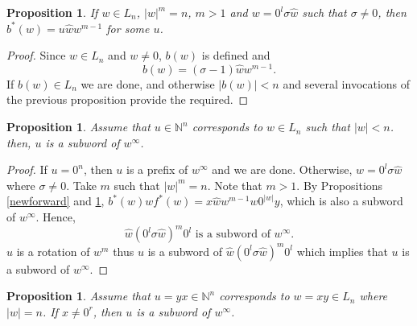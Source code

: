 \documentclass{article}
\newtheorem{proposition}[theorem]{Proposition}
\theoremstyle{definition}
\begin{document}


\begin{proposition}
\label{*-back}
If $w\in L_n$, $|w|^m=n$, $m>1$ and $w= 0^l\sigma\hat{w}$ such that $\sigma\neq 0$, then $b^*(w)=u\hat{w}w^{m-1}$ for some $u$.
\end{proposition}

\begin{proof}
Since $w\in L_n$ and $w\neq 0$, $b(w)$ is defined and 
$$b(w)=(\sigma-1)\hat{w}w^{m-1}.$$
If $b(w)\in L_n$ we are done, and otherwise $|b(w)|<n$ and several invocations of the previous proposition provide the required.
\end{proof}


\begin{proposition}
Assume that $u\in \mathbb{N}^n$ corresponds to $w\in L_n$ such that $|w|<n$. then, $u$ is a subword of $w^\infty$. 
\end{proposition}

\begin{proof}
If $u=0^n$, then $u$ is a prefix of $w^\infty$ and we are done. Otherwise, $w=0^l\sigma\hat{w}$ where $\sigma\neq 0$. Take $m$ such that $|w|^m=n$. Note that $m>1$. By Propositions \ref{newforward} and  \ref{*-back}, $b^*(w)wf^*(w)=x\hat{w}w^{m-1}w0^{|w|}y$, which is also a subword of $w^\infty$. Hence, 
$$\hat{w}(0^l\sigma\hat{w})^m0^l \text{ is a subword of } w^\infty.$$
$u$ is a rotation of $w^m$ thus $u$ is a subword of $\hat{w}(0^l\sigma\hat{w})^m0^l$ which implies that $u$ is a subword of $w^\infty$.
\end{proof}


\begin{proposition}
Assume that $u=yx\in\mathbb{N}^n$ corresponds to $w=xy\in L_n$ where $|w|=n$. If $x\neq 0^r$, then $u$ is a subword of $w^\infty$. 
\end{proposition}
\end{document}
